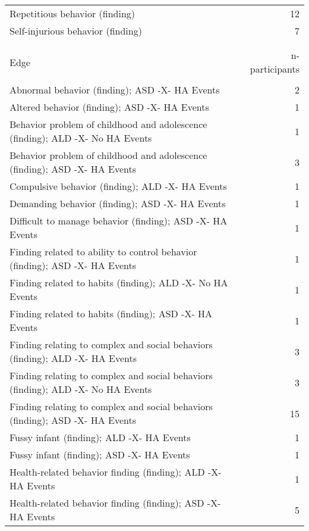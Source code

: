 \documentclass[10pt, letterpaper]{article}
\begin{document}
\begin{spacing}{1.0}
\begin{small}
\begin{longtable}[H]{p{5in}r}
        Repetitious behavior (finding) & 12 \\
        Self-injurious behavior (finding) & 7 \\
        &\\[-6pt]
        \hline\\[-8pt]
        Edge & n-participants\\
        \hline\\[-6pt]
        Abnormal behavior (finding); ASD -X- HA Events & 2 \\
        \rowcolor{ltBlue}
        Altered behavior (finding); ASD -X- HA Events & 1 \\
        Behavior problem of childhood and adolescence (finding); ALD -X- No HA Events & 1 \\
        \rowcolor{ltBlue}
        Behavior problem of childhood and adolescence (finding); ASD -X- HA Events & 3 \\
        Compulsive behavior (finding); ALD -X- HA Events & 1 \\
        \rowcolor{ltBlue}
        Demanding behavior (finding); ASD -X- HA Events & 1 \\
        Difficult to manage behavior (finding); ASD -X- HA Events & 1 \\
        \rowcolor{ltBlue}
        Finding related to ability to control behavior (finding); ASD -X- HA Events & 1 \\
        Finding related to habits (finding); ALD -X- No HA Events & 1 \\
        \rowcolor{ltBlue}
        Finding related to habits (finding); ASD -X- HA Events & 1 \\
        Finding relating to complex and social behaviors (finding); ALD -X- HA Events & 3 \\
        \rowcolor{ltBlue}
        Finding relating to complex and social behaviors (finding); ALD -X- No HA Events & 3 \\
        Finding relating to complex and social behaviors (finding); ASD -X- HA Events & 15 \\
        \rowcolor{ltBlue}
        Fussy infant (finding); ALD -X- HA Events & 1 \\
        Fussy infant (finding); ASD -X- HA Events & 1 \\
        \rowcolor{ltBlue}
        Health-related behavior finding (finding); ALD -X- HA Events & 1 \\
        Health-related behavior finding (finding); ASD -X- HA Events & 5 \\

\end{longtable}
\end{small}
\end{spacing}
\end{document}
